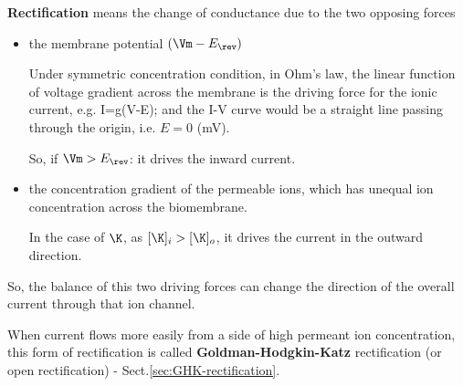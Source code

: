 {\bf Rectification} means the change of conductance due to the two opposing
forces
\begin{itemize}
  \item the membrane potential $(\Vm - E_\rev)$

Under symmetric concentration condition, in Ohm's law, the linear
function of voltage gradient across the membrane is the driving force for the
ionic current, e.g. I=g(V-E); and the I-V curve would be a straight line passing
through the origin, i.e. $E = 0$ (mV).

So, if $\Vm > E_\rev$: it drives the inward current.
  
  \item the concentration gradient of the permeable ions, which 
  has unequal ion concentration across the biomembrane.

In the case of $\K$, as $[\K]_i > [\K]_o$, it drives the current in the outward
direction.

\end{itemize}
So, the balance of this two driving forces can change the direction of the
overall current through that ion channel.

When current flows more easily from a side of high permeant ion
concentration, this form of rectification is called {\bf Goldman-Hodgkin-Katz}
rectification (or open rectification) - Sect.\ref{sec:GHK-rectification}.


